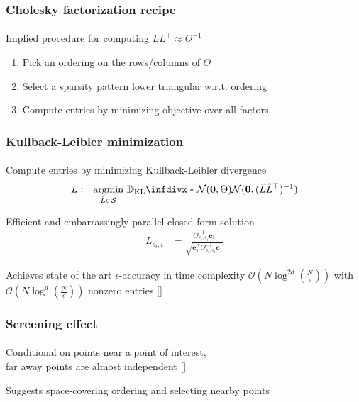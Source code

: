\documentclass{beamer}                             %
\newcommand*{\defeq}{\coloneqq}
\newcommand*{\BigO}{\mathcal{O}}
\newcommand*{\N}{\mathcal{N}}
\newcommand*{\SpSet}{\mathcal{S}}
\renewcommand*{\vec}[1]{\bm{#1}}
\newcommand*{\CM}{\Theta}
\DeclareMathOperator*{\argmin}{argmin}
\newcommand*{\KL}{\mathbb{D}_{\operatorname{KL}}\infdivx}
\newenvironment{wideitemize}
  {\itemize\setlength{\itemsep}{0.5cm}}
  {\enditemize}
\begin{document}
\begin{frame}
\frametitle{Cholesky factorization recipe}
\framesubtitle{}

\begin{wideitemize}
  \item<+-> Implied procedure for computing \( L L^{\top} \approx \CM^{-1} \)
    \begin{enumerate}
      \item Pick an ordering on the rows/columns of \( \CM \)
      \item Select a sparsity pattern lower triangular w.r.t. ordering
      \item Compute entries by minimizing objective over all factors
    \end{enumerate}
\end{wideitemize}
\end{frame}

\begin{frame}
\frametitle{Kullback-Leibler minimization}
\framesubtitle{}
\begin{wideitemize}
  \item<+-> Compute entries by minimizing Kullback-Leibler divergence
    \begin{align*}
      L \defeq \argmin_{\hat{L} \in \SpSet} \,
        \KL*{\N(\vec{0}, \CM)}
            {\N(\vec{0}, (\hat{L} \hat{L}^{\top})^{-1})}
    \end{align*}
  \item<+-> Efficient and embarrassingly parallel closed-form solution
    \begin{align*}
      L_{s_i, i} &= \frac{\CM_{s_i, s_i}^{-1} \vec{e}_1}
        {\sqrt{\vec{e}_1^{\top} \CM_{s_i, s_i}^{-1} \vec{e}_1}}
    \end{align*}
  \item<+-> Achieves state of the art \( \epsilon \)-accuracy in time
    complexity \( \BigO\left (N \log^{2d}\left (\frac{N}{\epsilon} \right
    ) \right ) \) with \( \BigO\left (N \log^{d}\left (\frac{N}{\epsilon}
    \right ) \right ) \) nonzero entries [\cite{schafer2021sparse}]
\end{wideitemize}
\end{frame}

\begin{frame}
\frametitle{Screening effect}
\framesubtitle{}

\begin{figure}[t]
  \centering
  \qquad
  
  \label{fig:screening}
\end{figure}

\begin{wideitemize}
  \item<+-> Conditional on points near a point of interest, \\
    far away points are almost independent [\cite{stein2002screening}]
  \item<+-> Suggests space-covering ordering
    and selecting nearby points %
\end{wideitemize}
\end{frame}
\end{document}
